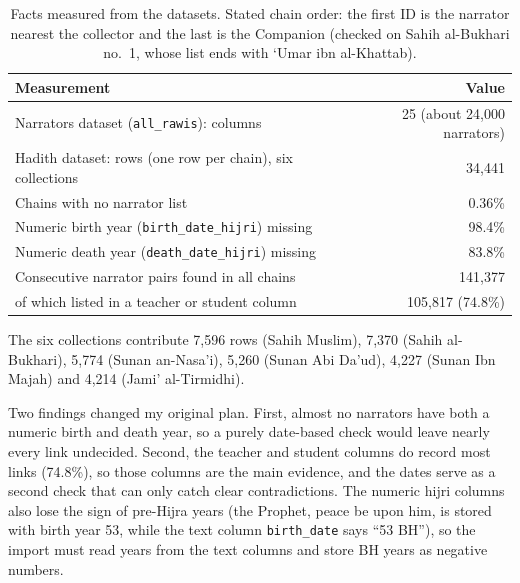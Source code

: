 \documentclass[11pt,a4paper]{article}
\begin{document}
\begin{table}[H]
\centering
\small
\begin{tabularx}{\textwidth}{@{}Xr@{}}
\toprule
\textbf{Measurement} & \textbf{Value}\\
\midrule
Narrators dataset (\texttt{all\_rawis}): columns & 25 (about 24,000 narrators)\\
Hadith dataset: rows (one row per chain), six collections & 34,441\\
Chains with no narrator list & 0.36\%\\
Numeric birth year (\texttt{birth\_date\_hijri}) missing & 98.4\%\\
Numeric death year (\texttt{death\_date\_hijri}) missing & 83.8\%\\
Consecutive narrator pairs found in all chains & 141,377\\
\quad of which listed in a teacher or student column & 105,817 (74.8\%)\\
\bottomrule
\end{tabularx}
\caption{Facts measured from the datasets. Stated chain order: the first ID is the narrator nearest the collector and the last is the Companion (checked on Sahih al-Bukhari no.~1, whose list ends with `Umar ibn al-Khattab).}
\label{tab:data}
\end{table}

The six collections contribute 7,596 rows (Sahih Muslim), 7,370 (Sahih al-Bukhari), 5,774 (Sunan an-Nasa'i), 5,260 (Sunan Abi Da'ud), 4,227 (Sunan Ibn Majah) and 4,214 (Jami' al-Tirmidhi).

Two findings changed my original plan. First, almost no narrators have both a numeric birth and death year, so a purely date-based check would leave nearly every link undecided. Second, the teacher and student columns do record most links (74.8\%), so those columns are the main evidence, and the dates serve as a second check that can only catch clear contradictions. The numeric hijri columns also lose the sign of pre-Hijra years (the Prophet, peace be upon him, is stored with birth year 53, while the text column \texttt{birth\_date} says ``53 BH''), so the import must read years from the text columns and store BH years as negative numbers.
\end{document}
